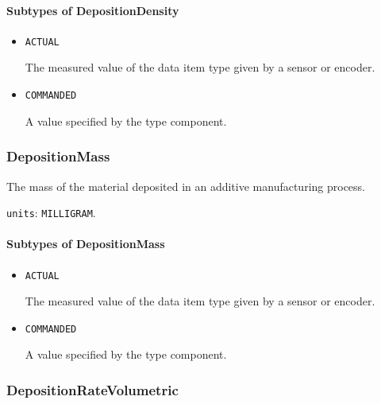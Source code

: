 \paragraph{Subtypes of DepositionDensity}\mbox{}
\label{sec:Subtypes of DepositionDensity}

\begin{itemize}

\item \texttt{ACTUAL}


The measured value of the data item type given by a sensor or encoder.

\item \texttt{COMMANDED}


A value specified by the  type component.


\end{itemize}





\subsubsection{DepositionMass}
\label{sec:DepositionMass}



The mass of the material deposited in an additive manufacturing process.


\texttt{units}: \texttt{MILLIGRAM}.

\paragraph{Subtypes of DepositionMass}\mbox{}
\label{sec:Subtypes of DepositionMass}

\begin{itemize}

\item \texttt{ACTUAL}


The measured value of the data item type given by a sensor or encoder.

\item \texttt{COMMANDED}


A value specified by the  type component.


\end{itemize}





\subsubsection{DepositionRateVolumetric}
\label{sec:DepositionRateVolumetric}



